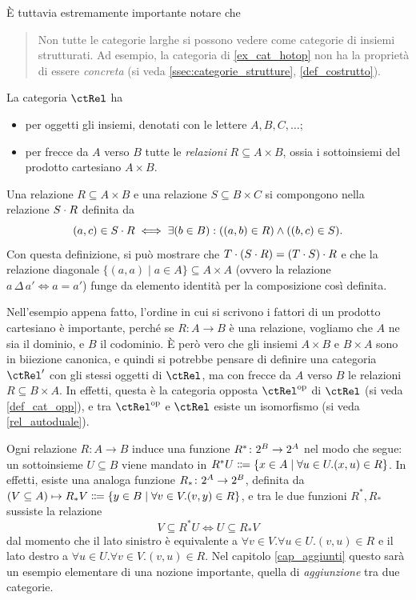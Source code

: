 È tuttavia estremamente importante notare che
\begin{quote}
 Non tutte le categorie larghe si possono vedere come categorie di insiemi strutturati. Ad esempio, la categoria di \ref{ex_cat_hotop} non ha la proprietà di essere \emph{concreta} (si veda \ref{ssec:categorie_strutture}, \ref{def_costrutto}).
\end{quote}
\begin{example}\label{ex_cat_rels}
 La categoria \(\ctRel\) ha
 \begin{itemize}
  \item per oggetti gli insiemi, denotati con le lettere \(A,B,C,\dots\);
  \item per frecce da \(A\) verso \(B\) tutte le \emph{relazioni} \(R\subseteq A\times B\), ossia i sottoinsiemi del prodotto cartesiano \(A\times B\).
 \end{itemize}
 Una relazione \(R\subseteq A\times B\) e una relazione \(S\subseteq B\times C\) si compongono nella relazione \(S\cdot R\) definita da
 \[(a,c)\in S\cdot R\iff \exists (b\in B) : ((a,b)\in R)\land ((b,c)\in S).\]
 Con questa definizione, si può mostrare che \(T\cdot(S\cdot R)=(T\cdot S)\cdot R\) e che la relazione diagonale \(\{(a,a)\mid a\in A\}\subseteq A\times A\) (ovvero la relazione \(a\,\Delta\,a'\iff a=a'\)) funge da elemento identità per la composizione così definita.
\end{example}
Nell'esempio appena fatto, l'ordine in cui si scrivono i fattori di un prodotto cartesiano è importante, perché se \(R \colon A\to B\) è una relazione, vogliamo che \(A\) ne sia il dominio, e \(B\) il codominio. È però vero che gli insiemi \(A\times B\) e \(B\times A\) sono in biiezione canonica, e quindi si potrebbe pensare di definire una categoria \(\ctRel'\) con gli stessi oggetti di \(\ctRel\), ma con frecce da \(A\) verso \(B\) le relazioni \(R\subseteq B\times A\). In effetti, questa è la categoria opposta \(\ctRel^\op\) di \(\ctRel\) (si veda \ref{def_cat_opp}), e tra \(\ctRel^\op\) e \(\ctRel\) esiste un isomorfismo (si veda \ref{rel_autoduale}).
\begin{remark}\label{klext_delle_relazioni}
 Ogni relazione \(R \colon A\to B\) induce una funzione \(R^* \colon 2^{B}\to 2^{A}\) nel modo che segue: un sottoinsieme \(U\subseteq B\) viene mandato in \(R^*U\defeq \{x\in A\mid \forall u\in U.(x,u)\in R\}\). In effetti, esiste una analoga funzione \(R_* \colon 2^{A}\to 2^{B}\), definita da \((V\subseteq A) \mapsto R_*V\defeq  \{y\in B\mid \forall v\in V.(v,y)\in R\}\), e tra le due funzioni \(R^*, R_*\) sussiste la relazione
 \[V\subseteq R^*U \iff U\subseteq R_*V\label{aggiunti_in_disguise}\]
 dal momento che il lato sinistro è equivalente a \(\forall v\in V.\forall u\in U.(v,u)\in R\) e il lato destro a \(\forall u\in U.\forall v\in V.(v,u)\in R\). Nel capitolo \ref{cap_aggiunti} questo sarà un esempio elementare di una nozione importante, quella di \emph{aggiunzione} tra due categorie.
\end{remark}
